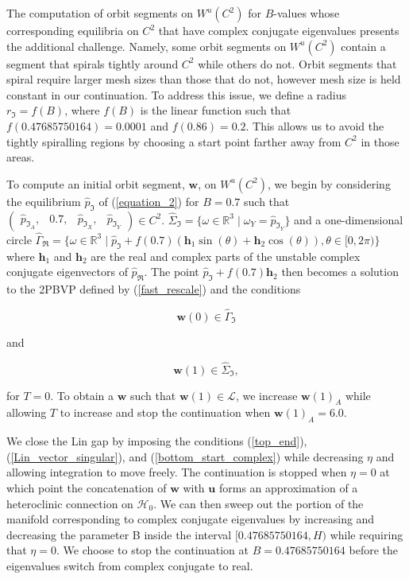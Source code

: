 \documentclass{ws-ijbc}
\begin{document}
The computation of orbit segments on $W^u(C^2)$ for $B$-values whose corresponding equilibria on $C^2$ that have complex conjugate eigenvalues presents the additional challenge.  Namely, some orbit segments on $W^u(C^2)$ contain a segment that spirals tightly around $C^2$ while others do not.  Orbit segments that spiral require larger mesh sizes than those that do not, however mesh size is held constant in our continuation.  To address this issue, we define a radius $r_{\Im} =  f(B)$, where $f(B)$ is the linear function such that $f(0.47685750164)=0.0001$ and $f(0.86)=0.2$.  This allows us to avoid the tightly spiralling regions by choosing a start point farther away from $C^2$ in those areas.

To compute an initial orbit segment, $\mathbf{w}$, on $W^u(C^2)$, we begin by considering the equilibrium $\hat{p}_{\Im}$ of (\ref{equation_2}) for $B=0.7$ such that $\begin{pmatrix} \hat{p}_{\Im_A},& 0.7,&\hat{p}_{\Im_X},&\hat{p}_{\Im_Y} \end{pmatrix} \in C^2$.  $\widehat{\Sigma}_{\Im} = \{ \omega \in \mathbb{R}^3  \; | \; \omega_Y = \hat{p}_{\Im_Y} \}$ and a one-dimensional circle $\widehat{\Gamma}_{\Re}= \{ \omega \in \mathbb{R}^3  \; | \; \hat{p}_{\Im} + f(0.7)(\mathbf{h}_1\sin(\theta) + \mathbf{h}_2\cos(\theta)), \theta \in [0,2\pi) \}$  where $\mathbf{h}_1$ and $\mathbf{h}_2$ are the real and complex parts of the unstable complex conjugate eigenvectors of $\hat{p}_{\Re}$.  The point $\hat{p}_{\Im} + f(0.7)\mathbf{h}_2$ then becomes a solution to the 2PBVP defined by (\ref{fast_rescale}) and the conditions

\begin{equation}
	\mathbf{w}(0) \in \widehat{\Gamma}_{\Im}
	\label{bottom_start_complex}
\end{equation}

and

\begin{equation}
	\mathbf{w}(1) \in \widehat{\Sigma}_{\Im},
\end{equation}

\noindent
for $T=0$.  To obtain a $\mathbf{w}$ such that $\mathbf{w}(1) \in \mathscr{L}$, we increase $\mathbf{w}(1)_A$ while allowing $T$ to increase and stop the continuation when $\mathbf{w}(1)_A=6.0$.

We close the Lin gap by imposing the conditions (\ref{top_end}), (\ref{Lin_vector_singular}), and (\ref{bottom_start_complex}) while decreasing $\eta$ and allowing integration to move freely.  The continuation is stopped when $\eta=0$ at which point the concatenation of $\mathbf{w}$ with $\mathbf{u}$ forms an approximation of a heteroclinic connection on $\mathscr{H}_0$.  We can then sweep out the portion of the manifold corresponding to complex conjugate eigenvalues by increasing and decreasing the parameter B inside the interval $[0.47685750164, H)$ while requiring that $\eta=0$.  We choose to stop the continuation at $B=0.47685750164$ before the eigenvalues switch from complex conjugate to real.
\end{document}
